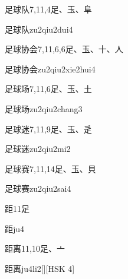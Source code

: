 \begin{entry}{足球队}{7,11,4}{⾜、⽟、⾩}
  \begin{phonetics}{足球队}{zu2qiu2dui4}
  \end{phonetics}
\end{entry}

\begin{entry}{足球协会}{7,11,6,6}{⾜、⽟、⼗、⼈}
  \begin{phonetics}{足球协会}{zu2qiu2xie2hui4}
  \end{phonetics}
\end{entry}

\begin{entry}{足球场}{7,11,6}{⾜、⽟、⼟}
  \begin{phonetics}{足球场}{zu2qiu2chang3}
  \end{phonetics}
\end{entry}

\begin{entry}{足球迷}{7,11,9}{⾜、⽟、⾡}
  \begin{phonetics}{足球迷}{zu2qiu2mi2}
  \end{phonetics}
\end{entry}

\begin{entry}{足球赛}{7,11,14}{⾜、⽟、⾙}
  \begin{phonetics}{足球赛}{zu2qiu2sai4}
  \end{phonetics}
\end{entry}

\begin{entry}{距}{11}{⾜}
  \begin{phonetics}{距}{ju4}
  \end{phonetics}
\end{entry}

\begin{entry}{距离}{11,10}{⾜、⼇}
  \begin{phonetics}{距离}{ju4li2}[][HSK 4]
  \end{phonetics}
\end{entry}

